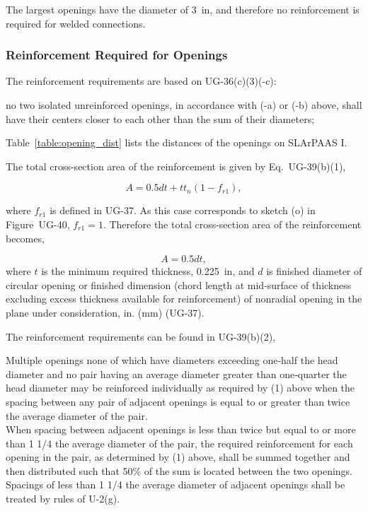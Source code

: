 The largest openings have the diameter of 3~in, 
and therefore no reinforcement is required for welded connections.

\subsubsection{Reinforcement Required for Openings}
\label{app:opening_reinforcement}

The reinforcement requirements are based on UG-36(c)(3)(-c):

\begin{displayquote}
    no two isolated unreinforced openings, in accordance with (-a) 
    or (-b) above, shall have their centers closer to each other than 
    the sum of their diameters;
\end{displayquote}

Table~\ref{table:opening_dist} lists the distances of the openings on SLArPAAS I.



The total cross-section area of the reinforcement is given by 
Eq.~UG-39(b)(1),

\begin{equation}
    A = 0.5dt + tt_n(1-f_{r1}),
\end{equation}

where $f_{r1}$ is defined in UG-37. 
As this case corresponds to sketch (o) in Figure~UG-40,
$f_{r1} = 1$.
Therefore the total cross-section area of the reinforcement becomes,

\begin{equation}
    A = 0.5dt,
\end{equation}
where $t$ is the minimum required thickness, 0.225~in,
and $d$ is finished diameter of circular opening or finished dimension 
(chord length at mid-surface of thickness excluding excess thickness 
available for reinforcement) of nonradial opening in the plane under 
consideration, in. (mm) (UG-37).

The reinforcement requirements can be found in UG-39(b)(2),

\begin{displayquote}
    Multiple openings none of which have diameters exceeding one‐half 
    the head diameter and no pair having an average diameter greater 
    than one‐quarter the head diameter may be reinforced individually 
    as required by (1) above when the spacing between any pair of 
    adjacent openings is equal to or greater than twice the average 
    diameter of the pair.\\

    When spacing between adjacent openings is less than twice but equal 
    to or more than 1 1/4 the average diameter of the pair, the required 
    reinforcement for each opening in the pair, as determined by (1) 
    above, shall be summed together and then distributed such that 50\% 
    of the sum is located between the two openings. 
    Spacings of less than 1 1/4 the average diameter of adjacent openings 
    shall be treated by rules of U-2(g).
\end{displayquote}

